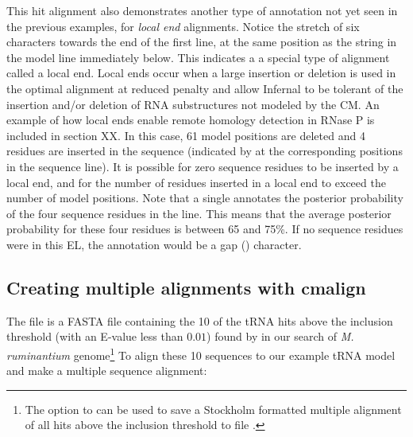 This hit alignment also demonstrates another type of annotation not
yet seen in the previous examples, for \emph{local end}
alignments. Notice the stretch of six \otext{~} characters towards the
end of the first  line, at the same position as the string
\otext{*[61]*} in the model line immediately below. This indicates a
a special type of alignment called a local end. Local ends occur when
a large insertion or deletion is used in the optimal alignment at
reduced penalty \cite{KleinEddy03} and allow Infernal to be tolerant
of the insertion and/or deletion of RNA substructures not modeled by the
CM. An example of how local ends enable remote homology detection in
RNase P is included in section XX. In this case, 61 model positions
are deleted and 4 residues are inserted in the sequence (indicated by 
\otext{*[ 4]*} at the corresponding positions in the sequence line). 
It is possible for zero sequence residues to be inserted by a local
end, and for the number of residues inserted in a local end to exceed the
number of model positions. Note that a single  annotates the
posterior probability of the four sequence residues in the 
line. This means that the average posterior probability for these four
residues is between 65 and 75\%. If no sequence residues were in this
EL, the  annotation would be a gap () character.

\subsection{Creating multiple alignments with cmalign}
The file  is a FASTA file containing
the 10 of the tRNA hits above the inclusion threshold (with an E-value
less than $0.01$) found by  in our 
search of \emph{M. ruminantium} genome\footnote{The
   option to  can be used to save a
  Stockholm formatted multiple alignment of all hits above the
  inclusion threshold to file .}
To align these 10 sequences to our example tRNA model and make a multiple sequence
alignment:


